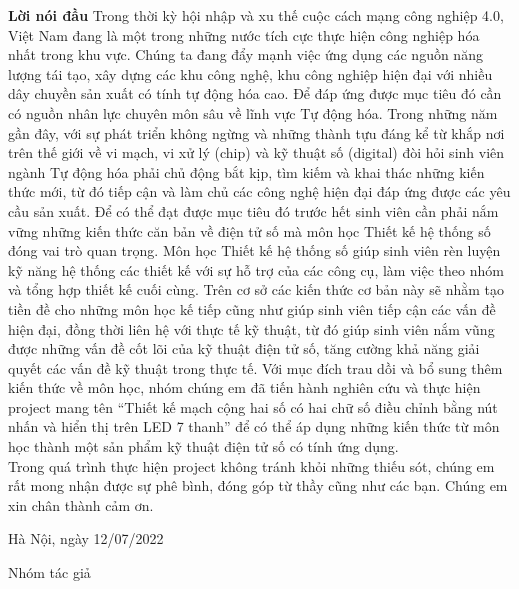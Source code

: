 \documentclass[10pt,a4paper]{report}
\begin{document}
\textbf{{\LARGE{Lời nói đầu}}}
Trong thời kỳ hội nhập và xu thế cuộc cách mạng công nghiệp 4.0, Việt Nam đang là một trong những nước tích cực thực hiện công nghiệp hóa nhất trong khu vực. Chúng ta đang đẩy mạnh việc ứng dụng các nguồn năng lượng tái tạo, xây dựng các khu công nghệ, khu công nghiệp hiện đại với nhiều dây chuyền sản xuất có tính tự động hóa cao. Để đáp ứng được mục tiêu đó cần có nguồn nhân lực chuyên môn sâu về lĩnh vực Tự động hóa. Trong những năm gần đây, với sự phát triển không ngừng và những thành tựu đáng kể từ khắp nơi trên thế giới về vi mạch, vi xử lý (chip) và kỹ thuật số (digital) đòi hỏi sinh viên ngành Tự động hóa phải chủ động bắt kịp, tìm kiếm và khai thác những kiến thức mới, từ đó tiếp cận và làm chủ các công nghệ hiện đại đáp ứng được các yêu cầu sản xuất. Để có thể đạt được mục tiêu đó trước hết sinh viên cần phải nắm vững những kiến thức căn bản về điện tử số mà môn học Thiết kế hệ thống số đóng vai trò quan trọng. 
Môn học Thiết kế hệ thống số giúp sinh viên rèn luyện kỹ năng hệ thống các  thiết kế với sự hỗ trợ của các công cụ, làm việc theo nhóm và tổng hợp thiết kế cuối cùng. Trên cơ sở các kiến thức cơ bản này sẽ nhằm tạo tiền đề cho những môn học kế tiếp cũng như giúp sinh viên tiếp cận các vấn đề hiện đại, đồng thời liên hệ với thực tế kỹ thuật, từ đó giúp sinh viên nắm vũng được những vấn đề cốt lõi của kỹ thuật điện tử số, tăng cường khả năng giải quyết các vấn đề kỹ thuật trong thực tế.
Với mục đích trau dồi và bổ sung thêm kiến thức về môn học, nhóm chúng em đã tiến hành nghiên cứu và thực hiện project mang tên “Thiết kế mạch cộng hai số có hai chữ số điều chỉnh bằng nút nhấn và hiển thị trên LED 7 thanh” để có thể áp dụng những kiến thức từ môn học thành một sản phẩm kỹ thuật điện tử số có tính ứng dụng.\\

Trong quá trình thực hiện project không tránh khỏi những thiếu sót, chúng em rất mong nhận được sự phê bình, đóng góp từ thầy cũng như các bạn. Chúng em xin chân thành cảm ơn.



\begin{flushleft}
	Hà Nội, ngày 12/07/2022

Nhóm tác giả
\end{flushleft}







\newpage 
\tableofcontents
\newpage
\end{document}
